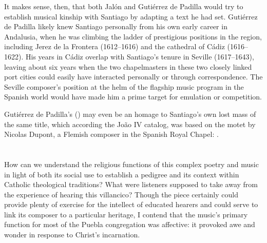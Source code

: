 It makes sense, then, that both Jalón and Gutiérrez de Padilla would try to
establish musical kinship with Santiago by adapting a text he had set.
Gutiérrez de Padilla likely knew Santiago personally from his own early career
in Andalusia, when he was climbing the ladder of prestigious positions in the
region, including Jerez de la Frontera (1612--1616) and the cathedral of Cádiz
(1616--1622).%
    \Autocite{Gembero:Padilla}
His years in Cádiz overlap with Santiago's tenure in Seville (1617--1643),
leaving about six years when the two chapelmasters in these two closely linked
port cities could easily have interacted personally or through correspondence.
The Seville composer's position at the helm of the flagship music program in
the Spanish world would have made him a prime target for emulation or
competition.%
\begin{Footnote}
    Gutiérrez de Padilla's 
    () may even be an homage to Santiago's own lost
    mass of the same title, which according the João IV catalog, was based
    on the motet  by Nicolas Dupont, a Flemish
    composer in the Spanish Royal Chapel:
    \Autocites 
    [417, caixão 34, : ;
    381, caixão 32, : ] 
    {JohnIV:Catalog}.
\end{Footnote}



\section{}

How can we understand the religious functions of this complex poetry and music
in light of both its social use to establish a pedigree and its context within
Catholic theological traditions?
What were listeners supposed to take away from the experience of hearing this
villancico?
Though the piece certainly could provide plenty of exercise for the intellect
of educated hearers and could serve to link its composer to a particular
heritage, I contend that the music's primary function for most of the Puebla
congregation was affective: it provoked awe and wonder in response to Christ's
incarnation.

